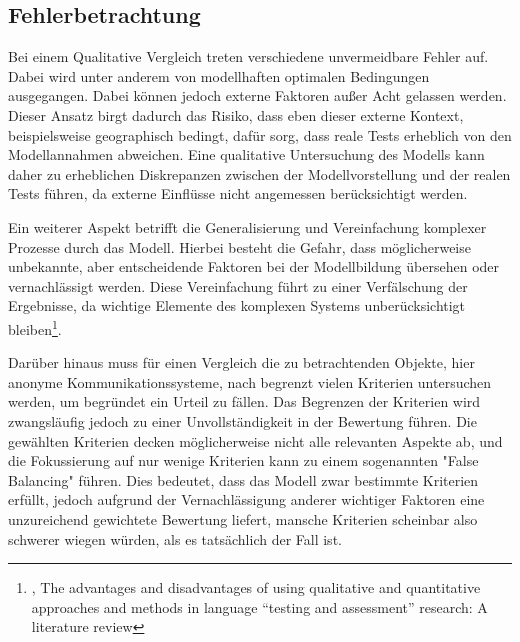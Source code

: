 \subsection{Fehlerbetrachtung}

Bei einem Qualitative Vergleich treten verschiedene unvermeidbare Fehler auf. Dabei wird unter anderem von modellhaften optimalen Bedingungen ausgegangen. Dabei können jedoch externe Faktoren außer Acht gelassen werden. Dieser Ansatz birgt dadurch das Risiko, dass eben dieser externe Kontext, beispielsweise geographisch bedingt, dafür sorg, dass reale Tests erheblich von den Modellannahmen abweichen. Eine qualitative Untersuchung des Modells kann daher zu erheblichen Diskrepanzen zwischen der Modellvorstellung und der realen Tests führen, da externe Einflüsse nicht angemessen berücksichtigt werden.

Ein weiterer Aspekt betrifft die Generalisierung und Vereinfachung komplexer Prozesse durch das Modell. Hierbei besteht die Gefahr, dass möglicherweise unbekannte, aber entscheidende Faktoren bei der Modellbildung übersehen oder vernachlässigt werden. Diese Vereinfachung führt zu einer Verfälschung der Ergebnisse, da wichtige Elemente des komplexen Systems unberücksichtigt bleiben\footnote{\cite{DisadvantagesOfQualitativApproaches}, The advantages and disadvantages of using qualitative and quantitative approaches and methods in language “testing and assessment” research: A literature review}.

Darüber hinaus muss für einen Vergleich die zu betrachtenden Objekte, hier anonyme Kommunikationssysteme, nach begrenzt vielen Kriterien untersuchen werden, um begründet ein Urteil zu fällen. Das Begrenzen der Kriterien wird zwangsläufig jedoch zu einer Unvollständigkeit in der Bewertung führen. Die gewählten Kriterien decken möglicherweise nicht alle relevanten Aspekte ab, und die Fokussierung auf nur wenige Kriterien kann zu einem sogenannten "False Balancing" führen. Dies bedeutet, dass das Modell zwar bestimmte Kriterien erfüllt, jedoch aufgrund der Vernachlässigung anderer wichtiger Faktoren eine unzureichend gewichtete Bewertung liefert, mansche Kriterien scheinbar also schwerer wiegen würden, als es tatsächlich der Fall ist.